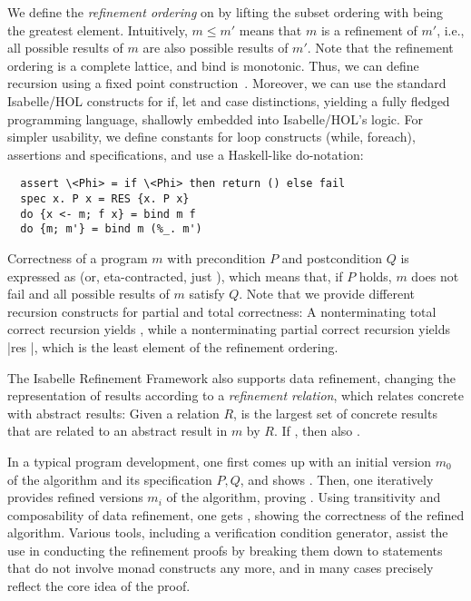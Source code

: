 \documentclass{llncs}
\begin{document}
We define the \emph{refinement ordering} on  by lifting the subset ordering with  being the greatest element.
Intuitively, $m\le m'$ means that $m$ is a refinement of $m'$, i.e., all possible results of $m$ are 
also possible results of $m'$. 
Note that the refinement ordering is a complete lattice, and bind is monotonic. Thus, we can define recursion using a fixed point construction~\cite{Kr10}.
Moreover, we can use the standard Isabelle/HOL constructs for if, let and case distinctions, yielding a fully fledged programming 
language, shallowly embedded into Isabelle/HOL's logic. For simpler usability, we define constants for loop constructs (while, foreach), 
assertions and specifications, and use a Haskell-like do-notation:
\begin{lstlisting}
  assert \<Phi> = if \<Phi> then return () else fail
  spec x. P x = RES {x. P x}
  do {x <- m; f x} = bind m f
  do {m; m'} = bind m (%_. m')
\end{lstlisting}

Correctness of a program $m$ with precondition $P$ and postcondition $Q$ is expressed as  (or, eta-contracted, just ), which
means that, if $P$ holds, $m$ does not fail and all possible results of $m$ satisfy $Q$. Note that we provide different recursion constructs
for partial and total correctness: A nonterminating total correct recursion yields , while a nonterminating partial correct 
recursion yields \isai|res {}|, which is the least element of the refinement ordering.

The Isabelle Refinement Framework also supports data refinement, changing the representation of results according to a \emph{refinement relation}, 
which relates concrete with abstract results: Given a relation $R$,  is the largest set of concrete results that are related to an 
abstract result in $m$ by $R$. If , then also .

In a typical program development, one first comes up with an initial version $m_0$ of
the algorithm and its specification $P,Q$, and shows . Then, one iteratively provides refined versions $m_i$ of the algorithm,
proving . Using transitivity and composability of data refinement, one 
gets , showing the correctness of the refined algorithm.
Various tools, including a verification condition generator, assist the use in conducting the refinement proofs by breaking 
them down to statements that do not involve monad constructs any more, and in many cases precisely reflect the core idea of the proof.
\end{document}

